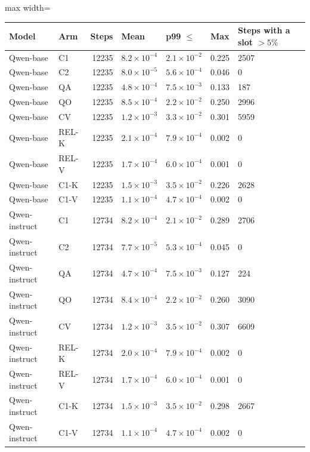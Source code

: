 \begin{table}[!htbp]
\centering\scriptsize
\begin{adjustbox}{max width=\linewidth}\begin{tabular}{@{}l l r l l l l@{}}
\toprule
Model & Arm & Steps & Mean & p99 $\le$ & Max & Steps with a slot $>5\%$ \\
\midrule
Qwen-base & C1 & 12235 & $8.2\times10^{-4}$ & $2.1\times10^{-2}$ & 0.225 & 2507 \\
Qwen-base & C2 & 12235 & $8.0\times10^{-5}$ & $5.6\times10^{-4}$ & 0.046 & 0 \\
Qwen-base & QA & 12235 & $4.8\times10^{-4}$ & $7.5\times10^{-3}$ & 0.133 & 187 \\
Qwen-base & QO & 12235 & $8.5\times10^{-4}$ & $2.2\times10^{-2}$ & 0.250 & 2996 \\
Qwen-base & CV & 12235 & $1.2\times10^{-3}$ & $3.3\times10^{-2}$ & 0.301 & 5959 \\
Qwen-base & REL-K & 12235 & $2.1\times10^{-4}$ & $7.9\times10^{-4}$ & 0.002 & 0 \\
Qwen-base & REL-V & 12235 & $1.7\times10^{-4}$ & $6.0\times10^{-4}$ & 0.001 & 0 \\
Qwen-base & C1-K & 12235 & $1.5\times10^{-3}$ & $3.5\times10^{-2}$ & 0.226 & 2628 \\
Qwen-base & C1-V & 12235 & $1.1\times10^{-4}$ & $4.7\times10^{-4}$ & 0.002 & 0 \\
\midrule
Qwen-instruct & C1 & 12734 & $8.2\times10^{-4}$ & $2.1\times10^{-2}$ & 0.289 & 2706 \\
Qwen-instruct & C2 & 12734 & $7.7\times10^{-5}$ & $5.3\times10^{-4}$ & 0.045 & 0 \\
Qwen-instruct & QA & 12734 & $4.7\times10^{-4}$ & $7.5\times10^{-3}$ & 0.127 & 224 \\
Qwen-instruct & QO & 12734 & $8.4\times10^{-4}$ & $2.2\times10^{-2}$ & 0.260 & 3090 \\
Qwen-instruct & CV & 12734 & $1.2\times10^{-3}$ & $3.5\times10^{-2}$ & 0.307 & 6609 \\
Qwen-instruct & REL-K & 12734 & $2.0\times10^{-4}$ & $7.9\times10^{-4}$ & 0.002 & 0 \\
Qwen-instruct & REL-V & 12734 & $1.7\times10^{-4}$ & $6.0\times10^{-4}$ & 0.001 & 0 \\
Qwen-instruct & C1-K & 12734 & $1.5\times10^{-3}$ & $3.5\times10^{-2}$ & 0.298 & 2667 \\
Qwen-instruct & C1-V & 12734 & $1.1\times10^{-4}$ & $4.7\times10^{-4}$ & 0.002 & 0 \\

\end{tabular}
\end{adjustbox}
\end{table}
